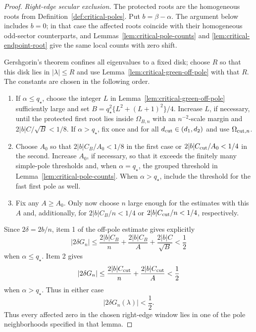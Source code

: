 \documentclass[twoside,10pt]{article}
\numberwithin{equation}{section}
\theoremstyle{slbody}
\theoremstyle{definition}
\theoremstyle{remark}
\begin{document}
\begin{proof}
\emph{Right-edge secular exclusion.}
The protected roots are the homogeneous roots from
Definition~\ref{def:critical-poles}.
Put $b=\beta-\alpha$.  The argument below includes $b=0$; in that case
the affected roots coincide with their homogeneous odd-sector
counterparts, and Lemmas~\ref{lem:critical-pole-counts} and
\ref{lem:critical-endpoint-root} give the same local counts with zero
shift.

Gershgorin's theorem confines all eigenvalues to a fixed disk; choose
$R$ so that this disk lies in $|\lambda|\le R$ and use
Lemma~\ref{lem:critical-green-off-pole} with that $R$.  The constants are
chosen in the following order.
\begin{enumerate}
\item If $\alpha\le q_\star$, choose the integer $L$ in
  Lemma~\ref{lem:critical-green-off-pole} sufficiently large and set
  $B=q_\star^2\{L^2+(L+1)^2\}/4$.  Increase $L$, if necessary, until the
  protected first root lies inside $\Omega_{B,n}$ with an
  $n^{-2}$-scale margin and $2|b|C/\sqrt B<1/8$.  If
  $\alpha>q_\star$, fix once and for all
  $d_{\rm cut}\in(d_1,d_2)$ and use $\Omega_{{\rm cut},n}$.
\item Choose $A_0$ so that
  $2|b|C_B/A_0<1/8$ in the first case or
  $2|b|C_{\rm cut}/A_0<1/4$ in the second.  Increase $A_0$, if necessary, so
  that it exceeds the finitely many simple-pole thresholds and, when
  $\alpha=q_\star$, the grouped threshold in
  Lemma~\ref{lem:critical-pole-counts}.  When $\alpha>q_\star$, include the
  threshold for the fast first pole as well.
\item Fix any $A\ge A_0$.  Only now choose $n$ large enough for the
  estimates with this $A$ and, additionally, for
  $2|b|C_B/n<1/4$ or $2|b|C_{\rm cut}/n<1/4$, respectively.
\end{enumerate}
Since $2\delta=2b/n$, item 1 of the off-pole estimate gives explicitly
\[
 |2\delta G_n|
 \le \frac{2|b|C_B}{n}+\frac{2|b|C_B}{A}
       +\frac{2|b|C}{\sqrt B}<\frac12
\]
when $\alpha\le q_\star$.  Item 2 gives
\[
 |2\delta G_n|
 \le \frac{2|b|C_{\rm cut}}{n}+\frac{2|b|C_{\rm cut}}{A}<\frac12
\]
when $\alpha>q_\star$.  Thus in either case
\begin{equation}\label{eq:critical-secular-exclusion}
 |2\delta G_n(\lambda)|<\frac12.
\end{equation}
Thus every affected zero in the chosen right-edge window lies in one of
the pole neighborhoods specified in that lemma.


\end{proof}
\end{document}
